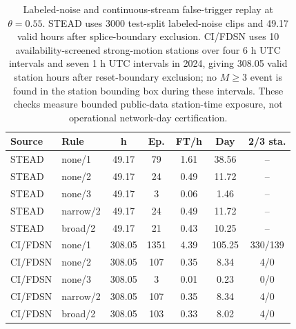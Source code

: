 \begin{table}[!t]
\centering
\caption{Labeled-noise and continuous-stream false-trigger replay at $\theta=0.55$. STEAD uses 3000 test-split labeled-noise clips and 49.17 valid hours after splice-boundary exclusion. CI/FDSN uses 10 availability-screened strong-motion stations over four 6 h UTC intervals and seven 1 h UTC intervals in 2024, giving 308.05 valid station hours after reset-boundary exclusion; no $M\geq3$ event is found in the station bounding box during these intervals. These checks measure bounded public-data station-time exposure, not operational network-day certification.}
\label{tab:continuous_false_alarm}
{\scriptsize\setlength{\tabcolsep}{1.2pt}\renewcommand{\arraystretch}{1.02}
\begin{tabular}{@{}llccccc@{}}
\toprule
Source & Rule & h & Ep. & FT/h & Day & 2/3 sta.\\
\midrule
STEAD & none/1 & 49.17 & 79 & 1.61 & 38.56 & --\\
STEAD & none/2 & 49.17 & 24 & 0.49 & 11.72 & --\\
STEAD & none/3 & 49.17 & 3 & 0.06 & 1.46 & --\\
STEAD & narrow/2 & 49.17 & 24 & 0.49 & 11.72 & --\\
STEAD & broad/2 & 49.17 & 21 & 0.43 & 10.25 & --\\
\addlinespace[1pt]
CI/FDSN & none/1 & 308.05 & 1351 & 4.39 & 105.25 & 330/139\\
CI/FDSN & none/2 & 308.05 & 107 & 0.35 & 8.34 & 4/0\\
CI/FDSN & none/3 & 308.05 & 3 & 0.01 & 0.23 & 0/0\\
CI/FDSN & narrow/2 & 308.05 & 107 & 0.35 & 8.34 & 4/0\\
CI/FDSN & broad/2 & 308.05 & 103 & 0.33 & 8.02 & 4/0\\
\bottomrule
\end{tabular}}
\end{table}
